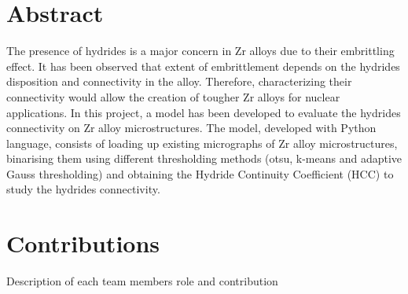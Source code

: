 \documentclass[12pt]{article}
\begin{document}
\onehalfspacing





\section*{Abstract}

\justifying
\noindent
The presence of hydrides is a major concern in Zr alloys due to their embrittling effect. It has been observed that extent of embrittlement depends on the hydrides disposition and connectivity in the alloy. Therefore, characterizing their connectivity would allow the creation of tougher Zr alloys for nuclear applications. In this project, a model has been developed to evaluate the hydrides connectivity on Zr alloy microstructures. The model, developed with Python language, consists of loading up existing micrographs of Zr alloy microstructures, binarising them using different thresholding methods (otsu, k-means and adaptive Gauss thresholding) and obtaining the Hydride Continuity Coefficient (HCC) to study the hydrides connectivity. 


\newpage
\begin{singlespacing}
\tableofcontents
\end{singlespacing}
\setlength{\parskip}{1em}
\renewcommand{\baselinestretch}{2.0}



\newpage 
{}
\setcounter{page}{1}
\onehalfspacing




\newpage 
\section*{Contributions}

Description of each team members role and contribution
\end{document}
